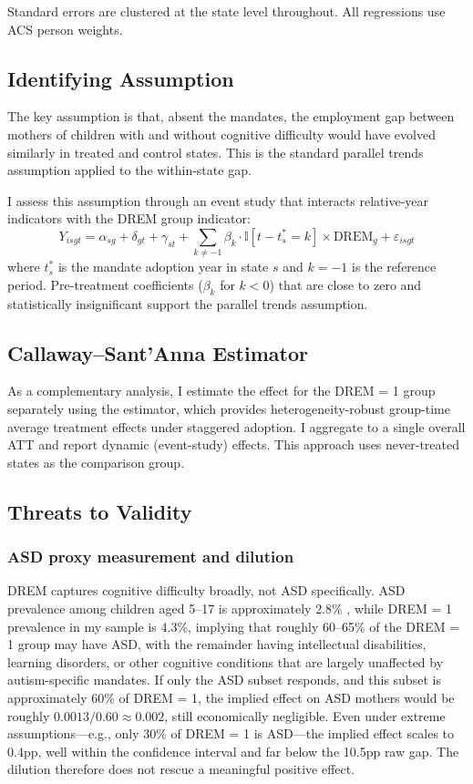 \documentclass[12pt]{article}
\newcommand{\ind}{\mathbb{I}}
\begin{document}
Standard errors are clustered at the state level throughout. All regressions use ACS person weights.

\subsection{Identifying Assumption}

The key assumption is that, absent the mandates, the employment gap between mothers of children with and without cognitive difficulty would have evolved similarly in treated and control states. This is the standard parallel trends assumption applied to the within-state gap.

I assess this assumption through an event study that interacts relative-year indicators with the DREM group indicator:
\begin{equation}
Y_{isgt} = \alpha_{sg} + \delta_{gt} + \gamma_{st} + \sum_{k \neq -1} \beta_k \cdot \ind[t - t^*_s = k] \times \text{DREM}_g + \varepsilon_{isgt}
\end{equation}
where $t^*_s$ is the mandate adoption year in state $s$ and $k = -1$ is the reference period. Pre-treatment coefficients ($\beta_k$ for $k < 0$) that are close to zero and statistically insignificant support the parallel trends assumption.

\subsection{Callaway--Sant'Anna Estimator}

As a complementary analysis, I estimate the effect for the DREM = 1 group separately using the \citet{callaway2021} estimator, which provides heterogeneity-robust group-time average treatment effects under staggered adoption. I aggregate to a single overall ATT and report dynamic (event-study) effects. This approach uses never-treated states as the comparison group.

\subsection{Threats to Validity}

\subsubsection*{ASD proxy measurement and dilution}  DREM captures cognitive difficulty broadly, not ASD specifically. ASD prevalence among children aged 5--17 is approximately 2.8\% \citep{maenner2023}, while DREM = 1 prevalence in my sample is 4.3\%, implying that roughly 60--65\% of the DREM = 1 group may have ASD, with the remainder having intellectual disabilities, learning disorders, or other cognitive conditions that are largely unaffected by autism-specific mandates. If only the ASD subset responds, and this subset is approximately 60\% of DREM = 1, the implied effect on ASD mothers would be roughly $0.0013 / 0.60 \approx 0.002$, still economically negligible. Even under extreme assumptions---e.g., only 30\% of DREM = 1 is ASD---the implied effect scales to 0.4pp, well within the confidence interval and far below the 10.5pp raw gap. The dilution therefore does not rescue a meaningful positive effect.
\end{document}
